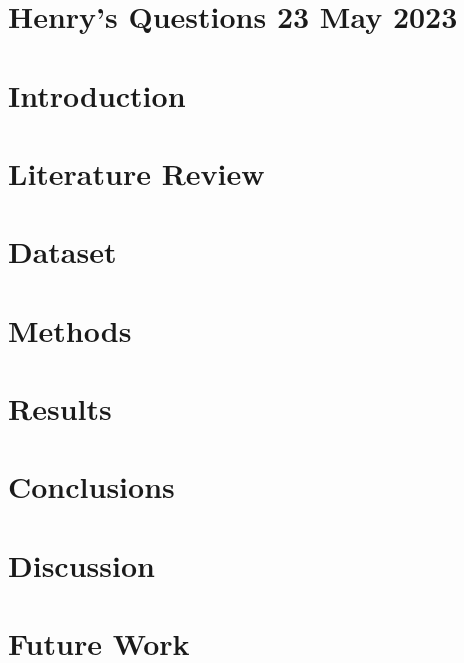 \documentclass[fleqn]{cas-sc}
\begin{document}
\maketitle


%
%
%

\section{Henry's Questions 23 May 2023}


\section{Introduction}\label{sec:Introduction}



\section{Literature Review}\label{LitReview}

\section{Dataset}\label{Dataset}

\section{Methods}\label{Methods}
%

\section{Results}\label{Results}
%

\section{Conclusions}\label{Conclusions}

\section{Discussion}\label{Discussion}

\section{Future Work}\label{FutureWork}
\end{document}
